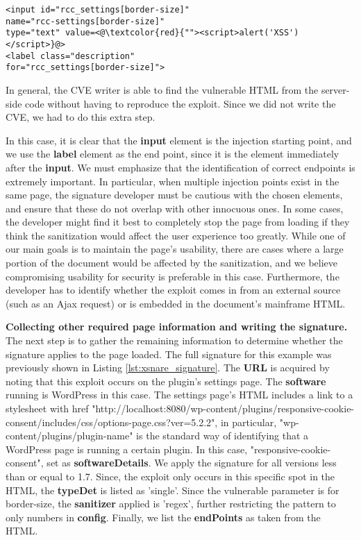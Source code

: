\begin{lstlisting}
<input id="rcc_settings[border-size]" 
name="rcc-settings[border-size]" 
type="text" value=<@\textcolor{red}{""><script>alert('XSS')</script>}@>
<label class="description"
for="rcc_settings[border-size]">
\end{lstlisting}

In general, the CVE writer is able to find the vulnerable HTML from the server-side code without having to reproduce the exploit. Since we did not write the CVE, we had to do this extra step.

In this case, it is clear that the \textbf{input} element is the injection starting point, and we use the \textbf{label} element as the end point, since it is the element immediately after the \textbf{input}. We must emphasize that the identification of correct endpoints is extremely important. In particular, when multiple injection points exist in the same page, the signature developer must be cautious with the chosen elements, and ensure that these do not overlap with other innocuous ones. In some cases, the developer might find it best to completely stop the page from loading if they think the sanitization would affect the user experience too greatly. While one of our main goals is to maintain the page’s usability, there are cases where a large portion of the document would be affected by the sanitization, and we believe compromising usability for security is preferable in this case. Furthermore, the developer has to identify whether the exploit comes in from an external source (such as an Ajax request) or is embedded in the document’s mainframe HTML. 

\textbf{Collecting other required page information and writing the signature.} The next step is to gather the remaining information to determine whether the signature applies to the page loaded. The full signature for this example was previously shown in Listing \ref{lst:xsnare_signature}. The \textbf{URL} is acquired by noting that this exploit occurs on the plugin's settings page. The \textbf{software} running is WordPress in this case. The settings page's HTML includes a link to a stylesheet with href "http://localhost:8080/wp-content/plugins/responsive-cookie-consent/includes/css/options-page.css?ver=5.2.2", in particular, "wp-content/plugins/plugin-name" is the standard way of identifying that a WordPress page is running a certain plugin. In this case, "responsive-cookie-consent", set as \textbf{softwareDetails}. We apply the signature for all versions less than or equal to 1.7. Since, the exploit only occurs in this specific spot in the HTML, the \textbf{typeDet} is listed as 'single'. 
Since the vulnerable parameter is for border-size, the \textbf{sanitizer} applied is 'regex', further restricting the pattern to only numbers in \textbf{config}. Finally, we list the \textbf{endPoints} as taken from the HTML.

